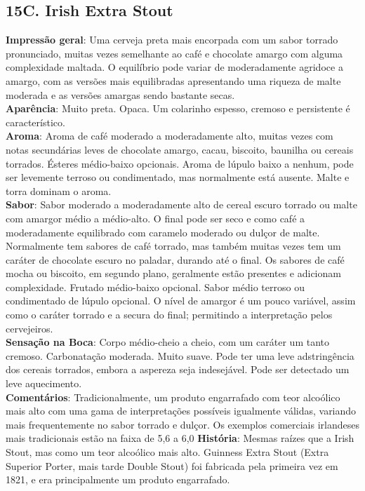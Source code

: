 \subsection*{15C. Irish Extra Stout}
\textbf{Impressão geral}: Uma cerveja preta mais encorpada com um sabor torrado pronunciado, muitas vezes semelhante ao café e chocolate amargo com alguma complexidade maltada. O equilíbrio pode variar de moderadamente agridoce a amargo, com as versões mais equilibradas apresentando uma riqueza de malte moderada e as versões amargas sendo bastante secas. \\
\textbf{Aparência}: Muito preta. Opaca. Um colarinho espesso, cremoso e persistente é característico. \\
\textbf{Aroma}: Aroma de café moderado a moderadamente alto, muitas vezes com notas secundárias leves de chocolate amargo, cacau, biscoito, baunilha ou cereais torrados. Ésteres médio-baixo opcionais. Aroma de lúpulo baixo a nenhum, pode ser levemente terroso ou condimentado, mas normalmente está ausente. Malte e torra dominam o aroma. \\
\textbf{Sabor}: Sabor moderado a moderadamente alto de cereal escuro torrado ou malte com amargor médio a médio-alto. O final pode ser seco e como café a moderadamente equilibrado com caramelo moderado ou dulçor de malte. Normalmente tem sabores de café torrado, mas também muitas vezes tem um caráter de chocolate escuro no paladar, durando até o final. Os sabores de café mocha ou biscoito, em segundo plano, geralmente estão presentes e adicionam complexidade. Frutado médio-baixo opcional. Sabor médio terroso ou condimentado de lúpulo opcional. O nível de amargor é um pouco variável, assim como o caráter torrado e a secura do final; permitindo a interpretação pelos cervejeiros. \\
\textbf{Sensação na Boca}: Corpo médio-cheio a cheio, com um caráter um tanto cremoso. Carbonatação moderada. Muito suave. Pode ter uma leve adstringência dos cereais torrados, embora a aspereza seja indesejável. Pode ser detectado um leve aquecimento. \\
\textbf{Comentários}: Tradicionalmente, um produto engarrafado com teor alcoólico mais alto com uma gama de interpretações possíveis igualmente válidas, variando mais frequentemente no sabor torrado e dulçor. Os exemplos comerciais irlandeses mais tradicionais estão na faixa de 5,6 a 6,0%
\textbf{História}: Mesmas raízes que a Irish Stout, mas como um teor alcoólico mais alto. Guinness Extra Stout (Extra Superior Porter, mais tarde Double Stout) foi fabricada pela primeira vez em 1821, e era principalmente um produto engarrafado. \\
